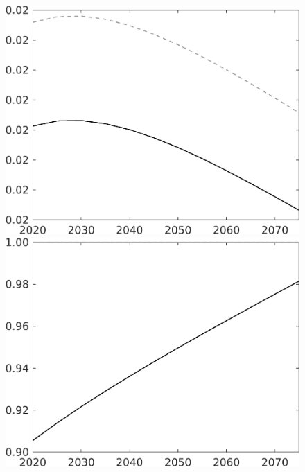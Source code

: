 \documentclass[12pt]{article}
\begin{document}
\begin{figure}[h!!]
\begin{minipage}[]{0.32\textwidth}
	\end{minipage}	
	\begin{minipage}[]{0.32\textwidth}
		\includegraphics[width=1\textwidth]{../../codding_model/own_basedOnFried/optimalPol_010922_revision/figures/all_13Sept22/CompTaul_Equlab_LFBAU_Reg0_G_spillover0_nsk0_xgr0_knspil1_sep1_countec0_GovRev0_etaa0.79_lgd0.png}
	\end{minipage}	
	\begin{minipage}[]{0.32\textwidth}
		\includegraphics[width=1\textwidth]{../../codding_model/own_basedOnFried/optimalPol_010922_revision/figures/all_13Sept22/CompTaul_Equlab_LFBAU_Reg0_lambdaa_spillover0_nsk0_xgr0_knspil1_sep1_countec0_GovRev0_etaa0.79_lgd0.png}

\end{minipage}
\end{figure}
\end{document}
